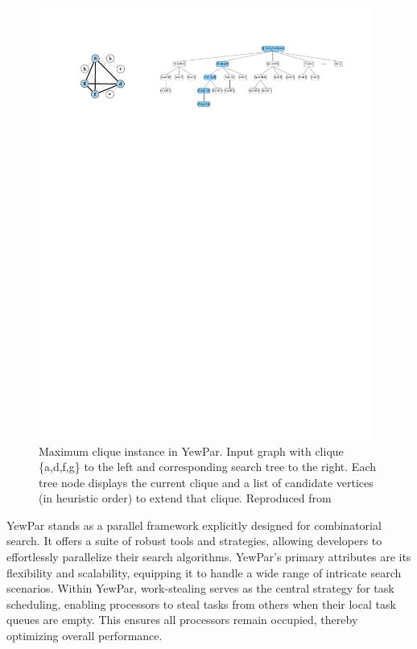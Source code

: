 \documentclass{mproj}
\begin{document}
\begin{figure}[h]
    \centering
    \includegraphics[width=0.98\textwidth]{images/yewpar_maxclique.pdf}
    \caption{Maximum clique instance in YewPar. Input graph with clique \{a,d,f,g\} to the left and corresponding search tree to the right. Each tree node displays the current clique and a list of candidate vertices (in heuristic order) to extend that clique. Reproduced from \cite{10.1145/3332466.3374537}}
    \label{fig:yewpar_maxclique}
\end{figure}
\FloatBarrier

YewPar stands as a parallel framework explicitly designed for combinatorial search.
It offers a suite of robust tools and strategies, allowing developers to effortlessly parallelize their search algorithms.
YewPar's primary attributes are its flexibility and scalability,
equipping it to handle a wide range of intricate search scenarios.
Within YewPar, work-stealing serves as the central strategy for task scheduling,
enabling processors to steal tasks from others when their local task queues are empty.
This ensures all processors remain occupied, thereby optimizing overall performance.
\end{document}
